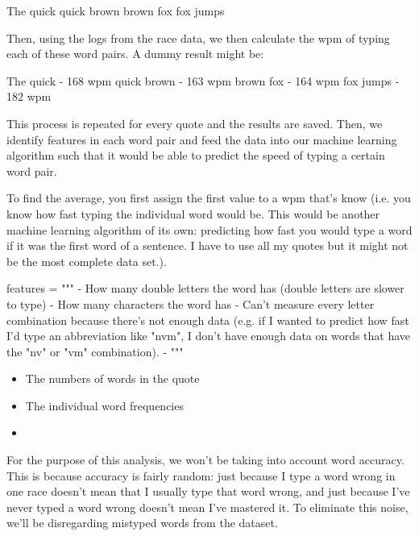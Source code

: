\documentclass{article}
\begin{document}
The quick
quick brown
brown fox
fox jumps

Then, using the logs from the race data, we then calculate the wpm of typing each of these word pairs. A dummy result might be:

The quick - 168 wpm
quick brown - 163 wpm
brown fox - 164 wpm
fox jumps - 182 wpm

This process is repeated for every quote and the results are saved. Then, we identify features in each word pair and feed the data into our machine learning algorithm such that it would be able to predict the speed of typing a certain word pair.

To find the average, you first assign the first value to a wpm that's know (i.e. you know how fast typing the individual word would be. This would be another machine learning algorithm of its own: predicting how fast you would type a word if it was the first word of a sentence. I have to use all my quotes but it might not be the most complete data set.).

\begin{pycode}
features = """
	- How many double letters the word has (double letters are slower to type)
	- How many characters the word has
	- Can't measure every letter combination because there's not enough data (e.g. if I wanted to predict how fast I'd type an abbreviation like "nvm", I don't have enough data on words that have the "nv" or "vm" combination).
	-
"""
\end{pycode}

\begin{itemize}
	\item The numbers of words in the quote
	\item The individual word frequencies
	\item
\end{itemize}

For the purpose of this analysis, we won't be taking into account word accuracy. This is because accuracy is fairly random: just because I type a word wrong in one race doesn't mean that I usually type that word wrong, and just because I've never typed a word wrong doesn't mean I've mastered it. To eliminate this noise, we'll be disregarding mistyped words from the dataset.
\end{document}

